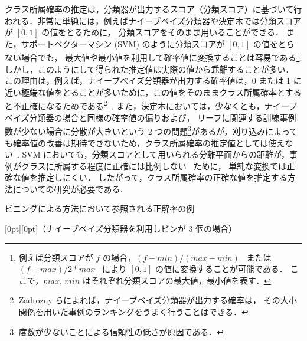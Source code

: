 \documentclass[japanese]{jnlp_1.4}
\begin{document}
クラス所属確率の推定は，分類器が出力するスコア（分類スコア）に基づいて行われる．非常に単純には，例えばナイーブベイズ分類器や決定木では分類スコアが $[0,1]$ の値をとるために，
分類スコアをそのまま用いることができる． 
また，サポートベクターマシン (SVM) のように分類スコアが $[0,1]$ の値をとらない場合でも，
最大値や最小値を利用して確率値に変換することは容易である\footnote{
	例えば分類スコアが $f$ の場合，$(f-min)/(max-min)$~\cite{Mizil05} または 
	$(f+max)/2*max$~\cite{Zadrozny02} により $[0,1]$ の値に変換することが可能である．
	ここで，$max$, $min$ はそれぞれ分類スコアの最大値，最小値を表す．
}. 
しかし，このようにして得られた推定値は実際の値から乖離することが多い．
この理由は，例えば，ナイーブベイズ分類器が出力する確率値は，0 または 1 に近い極端な値をとることが多いために，この値をそのままクラス所属確率とすると不正確になるためである\footnote{
	Zadrozny らによれば，ナイーブベイズ分類器が出力する確率は，
	その大小関係を用いた事例のランキングをうまく行うことはできる．
}~\cite{Zadrozny02}. 
また，決定木においては，少なくとも，ナイーブベイズ分類器の場合と同様の確率値の偏りおよび，
リーフに関連する訓練事例数が少ない場合に分散が大きいという 2 つの問題\footnote{
	度数が少ないことによる信頼性の低さが原因である．
}があるが，刈り込みによっても確率値の改善は期待できないため，クラス所属確率の推定値としては使えない~\cite{Zadrozny01b}.   
SVM においても，分類スコアとして用いられる分離平面からの距離が，事例がクラスに所属する程度に正確には比例しない~\cite{Zadrozny02} ために，
単純な変換では正確な値を推定しにくい．
したがって，クラス所属確率の正確な値を推定する方法についての研究が必要である.


\begin{table}[b]
\begin{center}
\caption{ビニングによる方法において参照される正解率の例}
\raisebox{1zw}[0pt][0pt]{（ナイーブベイズ分類器を利用しビンが 3 個の場合）}
\par
\label{bining1}

\end{center}
\end{table}
\end{document}
